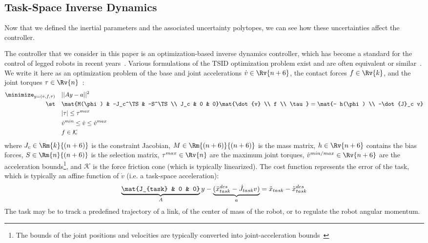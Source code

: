 \subsection{Task-Space Inverse Dynamics}
Now that we defined the inertial parameters and the associated uncertainty polytopes, we can see how these uncertainties affect the controller.

The controller that we consider in this paper is an optimization-based inverse dynamics controller, which has become a standard for the control of legged robots in recent years~\cite{DelPrete2014c,Herzog2016,Sentis2004,Saab2011}.
Various formulations of the TSID optimization problem exist and are often equivalent or similar~\cite{DelPrete2014c}.
We write it here as an optimization problem of the base and joint accelerations $\dot{v} \in \Rv{n+6}$, the contact forces \mbox{$f\in \Rv{k}$}, and the joint torques $\tau \in \Rv{n}$~\cite{Saab2013}:
\begin{subequations} 
\label{eq:TSID}
\begin{align}
\minimize_{y=(\dot{v}, f, \tau)} \quad &|| A y - a||^2 \nonumber\\
\st \quad & \mat{M(\phi) & -J_c^\TS & -S^\TS \\ J_c & 0 & 0} \mat{\dot{v} \\ f \\ \tau} = \mat{- h(\phi) \\ -\dot{J}_c v} \nonumber\\
& | \tau | \le \tau^{max} \label{eq:TSID_torque_lim}\\
& \dot{v}^{min} \le \dot{v} \le \dot{v}^{max} \label{eq:TSID_acc_lim}\\
& f \in \mathcal{K} \label{eq:TSID_force_lim}
\end{align} 
\end{subequations}
where \mbox{$J_c \in \Rm{k}{(n+6)}$} is the constraint Jacobian, $M \in \Rm{(n+6)}{(n+6)}$ is the mass matrix, $h \in \Rv{n+6}$ contains the bias forces, $S\in \Rm{n}{(n+6)}$ is the selection matrix, $\tau^{max} \in \Rv{n}$ are the maximum joint torques, $\dot{v}^{min/max} \in \Rv{n+6}$ are the acceleration bounds\footnote{The bounds of the joint positions and velocities are typically converted into joint-acceleration bounds~\cite{Padois2010}}, and $\mathcal{K}$ is the force friction cone (which is typically linearized).
The cost function represents the error of the task, which is typically an affine function of $\dot{v}$ (i.e. a task-space acceleration):
\begin{equation*} \begin{aligned}
\underbrace{\mat{J_{task} & 0 & 0}}_A y - \underbrace{(\ddot{x}_{task}^{des} - \dot{J}_{task} v)}_a = \ddot{x}_{task} - \ddot{x}_{task}^{des}
\end{aligned} \end{equation*}
The task may be to track a predefined trajectory of a link, of the center of mass of the robot, or to regulate the robot angular momentum.

